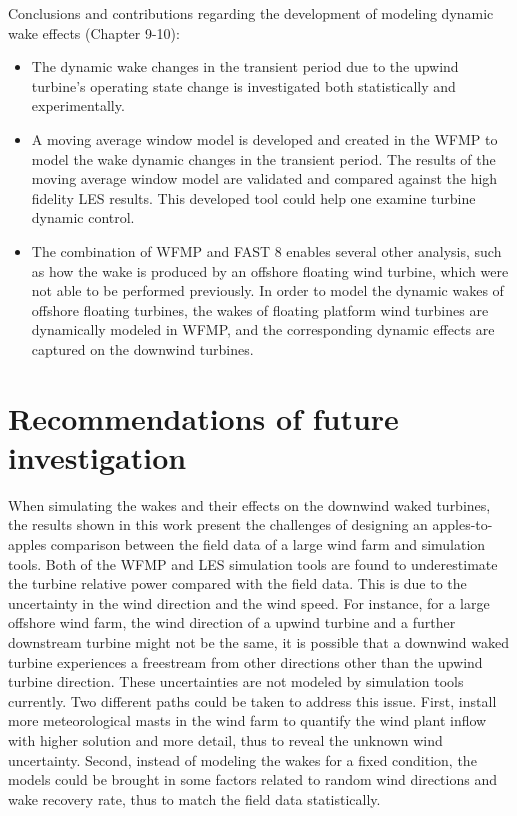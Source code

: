 \documentclass{umthesis}
\begin{document}
Conclusions and contributions regarding the development of modeling dynamic wake effects (Chapter 9-10):
\begin{itemize}
  \item The dynamic wake changes in the transient period due to the upwind turbine's operating state change is investigated both statistically and experimentally.
  \item A moving average window model is developed and created in the WFMP to model the wake dynamic changes in the transient period. The results of the moving average window model are validated and compared against the high fidelity LES results. This developed tool could help one examine turbine dynamic control.
  \item The combination of WFMP and FAST 8 enables several other analysis, such as how the wake is produced by an offshore floating wind turbine, which were not able to be performed previously. In order to model the dynamic wakes of offshore floating turbines, the wakes of floating platform wind turbines are dynamically modeled in WFMP, and the corresponding dynamic effects are captured on the downwind turbines. 
\end{itemize}

\section{Recommendations of future investigation}
When simulating the wakes and their effects on the downwind waked turbines, the results shown in this work present the challenges of designing an apples-to-apples comparison between the field data of a large wind farm and simulation tools. Both of the WFMP and LES simulation tools are found to underestimate the turbine relative power compared with the field data. This is due to the uncertainty in the wind direction and the wind speed. For instance, for a large offshore wind farm, the wind direction of a upwind turbine and a further downstream turbine might not be the same, it is possible that a downwind waked turbine experiences a freestream from other directions other than the upwind turbine direction. These uncertainties are not modeled by simulation tools currently. Two different paths could be taken to address this issue. First, install more meteorological masts in the wind farm to quantify the wind plant inflow with higher solution and more detail, thus to reveal the unknown wind uncertainty. Second, instead of modeling the wakes for a fixed condition, the models could be brought in some factors related to random wind directions and wake recovery rate, thus to match the field data statistically. 
\end{document}
